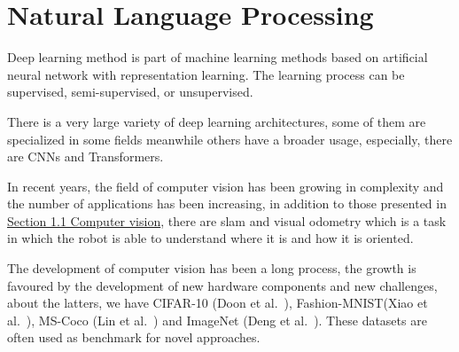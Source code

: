 \section{Natural Language Processing}\label{sec:nlp}

Deep learning method is part of machine learning methods based on artificial neural network with representation learning.
The learning process can be supervised, semi-supervised, or unsupervised.

There is a very large variety of deep learning architectures, some of them are specialized in some fields meanwhile others have a broader usage, especially, there are CNNs and Transformers.

In recent years, the field of computer vision has been growing in complexity and the number of applications has been increasing, in addition to those presented in \hyperref[sec:background]{Section 1.1 Computer vision}, there are \gls{slam} and visual odometry which is a task in which the robot is able to understand where it is and how it is oriented.

The development of computer vision has been a long process, the growth is favoured by the development of new hardware components and new challenges, about the latters, we have
CIFAR-10 (Doon et al.~\cite{cifar10_paper}), Fashion-MNIST(Xiao et al.~\cite{fashion_mnist_paper}), MS-Coco (Lin et al.~\cite{ms_coco_paper}) and ImageNet (Deng et al.~\cite{imagenet_paper}).
These datasets are often used as benchmark for novel approaches.

